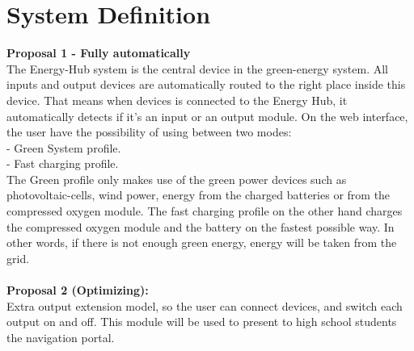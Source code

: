 \section{System Definition}
\textbf{Proposal 1 - Fully automatically}\\
The Energy-Hub system is the central device in the green-energy system. All
inputs and output devices are automatically routed to the right place inside this
device. That means when devices is connected to the Energy Hub, it automatically
detects if it's an input or an output module. On the web interface, the user
have the possibility of using between two modes:
\\ - Green System profile.
\\ - Fast charging profile.
\\The Green profile only makes use of the green power devices such as
photovoltaic-cells, wind power, energy from the charged batteries or from the
compressed oxygen module. 
The fast charging profile on the other hand charges the compressed oxygen module and the
battery on the fastest possible way. In other words, if there is not enough
green energy, energy will be taken from the grid.
\\\\
\textbf{Proposal 2 (Optimizing):}\\
Extra output extension model, so the user can connect devices, and switch
each output on and off. This module will be used to present to high school
students the navigation portal.
